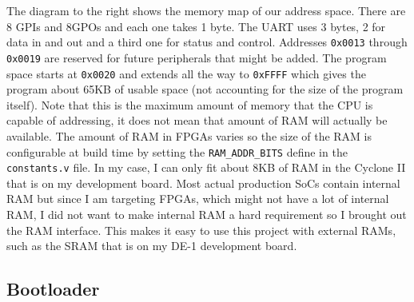 \documentclass[10pt]{article}
\begin{document}
        The diagram to the right shows the memory map of our address space.
        There are 8 GPIs and 8GPOs and each one takes 1 byte.  The UART uses 3
        bytes, 2 for data in and out and a third one for status and control.
        Addresses \texttt{0x0013} through \texttt{0x0019} are reserved for
        future peripherals that might be added. The program space starts at
        \texttt{0x0020} and extends all the way to \texttt{0xFFFF} which gives
        the program about 65KB of usable space (not accounting for the size of
        the program itself). Note that this is the maximum amount of memory
        that the CPU is capable of addressing, it does not mean that amount of
        RAM will actually be available. The amount of RAM in FPGAs varies so
        the size of the RAM is configurable at build time by setting the
        \texttt{RAM\_ADDR\_BITS} define in the \texttt{constants.v} file. In my
        case, I can only fit about 8KB of RAM in the Cyclone II that is on my
        development board. Most actual production SoCs contain internal RAM but
        since I am targeting FPGAs, which might not have a lot of internal RAM,
        I did not want to make internal RAM a hard requirement so I brought out
        the RAM interface.  This makes it easy to use this project with
        external RAMs, such as the SRAM that is on my DE-1 development board.

    \subsection{Bootloader}
\end{document}
